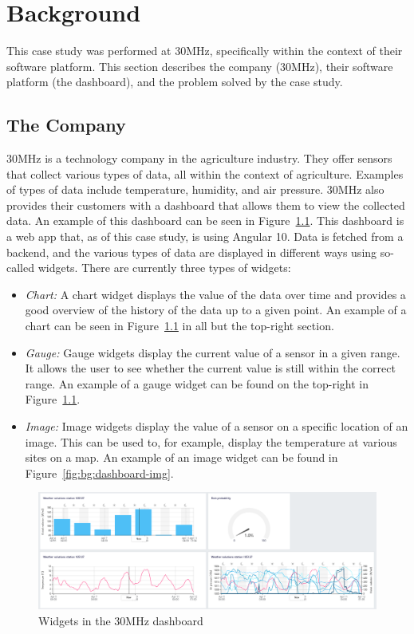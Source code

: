 \chapter{Background}\label{chap:background}

This case study was performed at 30MHz, specifically within the context of their software platform. This section describes the company (30MHz), their software platform (the dashboard), and the problem solved by the case study.

\section{The Company}\label{sec:bg:thecompany}
30MHz is a technology company in the agriculture industry. They offer sensors that collect various types of data, all within the context of agriculture. Examples of types of data include temperature, humidity, and air pressure. 30MHz also provides their customers with a dashboard that allows them to view the collected data. An example of this dashboard can be seen in Figure~\ref{fig:bg:dashboard}. This dashboard is a web app that, as of this case study, is using Angular 10. Data is fetched from a backend, and the various types of data are displayed in different ways using so-called widgets. There are currently three types of widgets:

\begin{itemize}
  \item \emph{Chart:} A chart widget displays the value of the data over time and provides a good overview of the history of the data up to a given point. An example of a chart can be seen in Figure~\ref{fig:bg:dashboard} in all but the top-right section.
  \item \emph{Gauge:} Gauge widgets display the current value of a sensor in a given range. It allows the user to see whether the current value is still within the correct range. An example of a gauge widget can be found on the top-right in Figure~\ref{fig:bg:dashboard}.
  \item \emph{Image:} Image widgets display the value of a sensor on a specific location of an image. This can be used to, for example, display the temperature at various sites on a map. An example of an image widget can be found in Figure~\ref{fig:bg:dashboard-img}.
\end{itemize}

\begin{figure}[h]
  \includegraphics[width=\columnwidth]{figures/background/dashboard.png}
  \caption{Widgets in the 30MHz dashboard}
  \label{fig:bg:dashboard}
  \centering
\end{figure}

